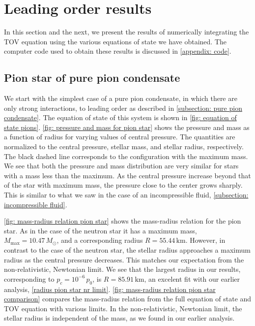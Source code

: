 \section{Leading order results}

In this section and the next, we present the results of numerically integrating the TOV equation using the various equations of state we have obtained.
The computer code used to obtain these results is discussed in \autoref{appendix: code}.



\subsection{Pion star of pure pion condensate}

We start with the simplest case of a pure pion condensate, in which there are only strong interactions, to leading order as described in \autoref{subsection: pure pion condensate}.
The equation of state of this system is shown in \autoref{fig: equation of state pions}.
\autoref{fig: pressure and mass for pion star} shows the pressure and mass as a function of radius for varying values of central pressure.
The quantities are normalized to the central pressure, stellar mass, and stellar radius, respectively.
The black dashed line corresponds to the configuration with the maximum mass.
We see that both the pressure and mass distribution are very similar for stars with a mass less than the maximum.
As the central pressure increase beyond that of the star with maximum mass, the pressure close to the center grows sharply.
This is similar to what we saw in the case of an incompressible fluid, \autoref{subsection: incompressible fluid}.

\autoref{fig: mass-radius relation pion star} shows the mass-radius relation for the pion star.
As in the case of the neutron star it has a maximum mass, $M_\text{max} = 10.47\, M_\odot$, and a corresponding radius $R = 55.44\,\text{km}$.
However, in contrast to the case of the neutron star, the stellar radius approaches a maximum radius as the central pressure decreases.
This matches our expectation from the non-relativistic, Newtonian limit.
We see that the largest radius in our results, corresponding to  $p_c = 10^{-6} \, p_0$, is $R = 85.91 \, \text{km}$, an excelent fit with our earlier analysis, \autoref{radius pion star nr limit}.
\autoref{fig: mass-radius relation pion star comparison} compares the mass-radius relation from the full equation of state and TOV equation with various limits.
In the non-relativistic, Newtonian limit, the stellar radius is independent of the mass, as we found in our earlier analysis.


